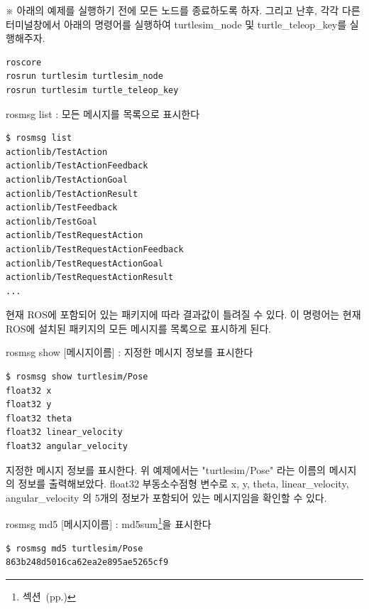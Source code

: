 \vspace{\baselineskip}
\noindent
※ 아래의 예제를 실행하기 전에 모든 노드를 종료하도록 하자. 그리고 난후, 각각 다른 터미널창에서 아래의 명령어를 실행하여 turtlesim\_node 및 turtle\_teleop\_key를 실행해주자.

\begin{lstlisting}[language=ROS]
roscore
rosrun turtlesim turtlesim_node 
rosrun turtlesim turtle_teleop_key
\end{lstlisting}

\setcounter{num}{0}

\vspace{\baselineskip}
\noindent
{}\circled{\thenum} rosmsg list : 모든 메시지를 목록으로 표시한다

\begin{lstlisting}[language=ROS]
$ rosmsg list
actionlib/TestAction
actionlib/TestActionFeedback
actionlib/TestActionGoal
actionlib/TestActionResult
actionlib/TestFeedback
actionlib/TestGoal
actionlib/TestRequestAction
actionlib/TestRequestActionFeedback
actionlib/TestRequestActionGoal
actionlib/TestRequestActionResult
...
\end{lstlisting}

\noindent
현재 ROS에 포함되어 있는 패키지에 따라 결과값이 틀려질 수 있다. 이 명령어는 현재 ROS에 설치된 패키지의 모든 메시지를 목록으로 표시하게 된다.

\vspace{\baselineskip}
\noindent
{}\circled{\thenum} rosmsg show [메시지이름] : 지정한 메시지 정보를 표시한다

\begin{lstlisting}[language=ROS]
$ rosmsg show turtlesim/Pose 
float32 x
float32 y
float32 theta
float32 linear_velocity
float32 angular_velocity
\end{lstlisting}

\noindent
지정한 메시지 정보를 표시한다. 위 예제에서는 "turtlesim/Pose" 라는 이름의 메시지의 정보를 출력해보았다. float32 부동소수점형 변수로 x, y, theta, linear\_velocity, angular\_velocity 의 5개의 정보가 포함되어 있는 메시지임을 확인할 수 있다.

\vspace{\baselineskip}
\noindent
{}\circled{\thenum} rosmsg md5 [메시지이름] : md5sum\footnote{섹션~(pp.\pageref{def:RosMD5})}을 표시한다

\begin{lstlisting}[language=ROS]
$ rosmsg md5 turtlesim/Pose 
863b248d5016ca62ea2e895ae5265cf9
\end{lstlisting}


